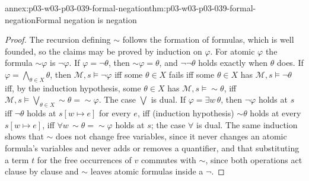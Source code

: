 \begin{annexitem}{annex:p03-w03-p03-039-formal-negation}{thm:p03-w03-p03-039-formal-negation}{Formal negation is negation}
\begin{proof}
The recursion defining \({\sim}\) follows the formation of formulas, which is
well founded, so the claims may be proved by induction on \(\varphi\). For
atomic \(\varphi\) the formula \({\sim}\varphi\) is \(\neg\varphi\). If
\(\varphi=\neg\theta\), then \({\sim}\varphi=\theta\), and \(\neg\neg\theta\)
holds exactly when \(\theta\) does. If \(\varphi=\bigwedge_{\theta\in X}\theta\),
then \(\mathcal M,s\models\neg\varphi\) iff some \(\theta\in X\) fails iff
some \(\theta\in X\) has \(\mathcal M,s\models\neg\theta\) iff, by the
induction hypothesis, some \(\theta\in X\) has
\(\mathcal M,s\models{\sim}\theta\), iff
\(\mathcal M,s\models\bigvee_{\theta\in X}{\sim}\theta={\sim}\varphi\). The
case \(\bigvee\) is dual. If \(\varphi=\exists w\,\theta\), then
\(\neg\varphi\) holds at \(s\) iff \(\neg\theta\) holds at
\(s[w\mapsto e]\) for every \(e\), iff (induction hypothesis) \({\sim}\theta\)
holds at every \(s[w\mapsto e]\), iff \(\forall w\,{\sim}\theta={\sim}\varphi\)
holds at \(s\); the case \(\forall\) is dual. The same induction shows that
\({\sim}\) does not change free variables, since it never changes an atomic
formula's variables and never adds or removes a quantifier, and that
substituting a term \(t\) for the free occurrences of \(v\) commutes with
\({\sim}\), since both operations act clause by clause and \({\sim}\) leaves
atomic formulas inside a \(\neg\).
\end{proof}
\end{annexitem}

